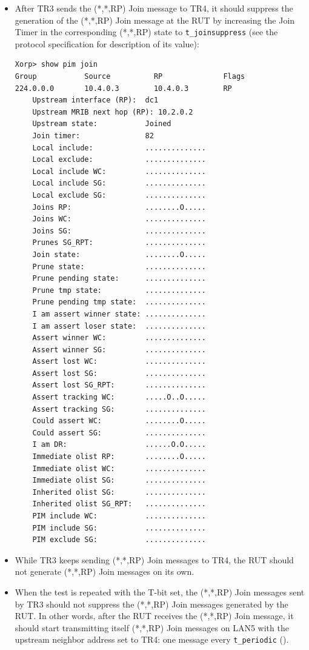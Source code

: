 \documentclass[11pt]{report}
\begin{document}
\begin{itemize}
  \item After TR3 sends the (*,*,RP) Join message to TR4, it should suppress
  the generation of the (*,*,RP) Join message at the RUT by increasing the
  Join Timer in the corresponding (*,*,RP) state to \verb=t_joinsuppress=
  (see the protocol specification for description of its value):

\begin{verbatim}
Xorp> show pim join 
Group           Source          RP              Flags
224.0.0.0       10.4.0.3        10.4.0.3        RP   
    Upstream interface (RP):  dc1
    Upstream MRIB next hop (RP): 10.2.0.2
    Upstream state:           Joined 
    Join timer:               82
    Local include:            ..............
    Local exclude:            ..............
    Local include WC:         ..............
    Local include SG:         ..............
    Local exclude SG:         ..............
    Joins RP:                 ........O.....
    Joins WC:                 ..............
    Joins SG:                 ..............
    Prunes SG_RPT:            ..............
    Join state:               ........O.....
    Prune state:              ..............
    Prune pending state:      ..............
    Prune tmp state:          ..............
    Prune pending tmp state:  ..............
    I am assert winner state: ..............
    I am assert loser state:  ..............
    Assert winner WC:         ..............
    Assert winner SG:         ..............
    Assert lost WC:           ..............
    Assert lost SG:           ..............
    Assert lost SG_RPT:       ..............
    Assert tracking WC:       .....O..O.....
    Assert tracking SG:       ..............
    Could assert WC:          ........O.....
    Could assert SG:          ..............
    I am DR:                  ......O.O.....
    Immediate olist RP:       ........O.....
    Immediate olist WC:       ..............
    Immediate olist SG:       ..............
    Inherited olist SG:       ..............
    Inherited olist SG_RPT:   ..............
    PIM include WC:           ..............
    PIM include SG:           ..............
    PIM exclude SG:           ..............
\end{verbatim}

  \item While TR3 keeps sending (*,*,RP) Join messages to TR4, the RUT should
  not generate (*,*,RP) Join messages on its own.

  \item When the test is repeated with the T-bit set, the (*,*,RP) Join
  messages sent by TR3 should not suppress the (*,*,RP) Join messages
  generated by the RUT. In other words, after the RUT receives the (*,*,RP)
  Join message, it should start transmitting itself (*,*,RP) Join messages on
  LAN5 with the upstream neighbor address set to TR4: one message every
  \verb=t_periodic= ({\PimsmTPeriodic}).

\end{itemize}
\end{document}
